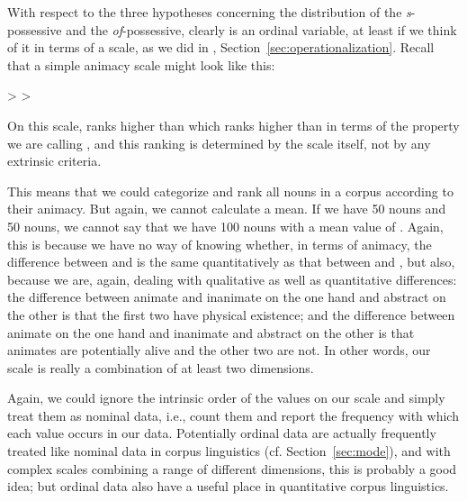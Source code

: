 With respect to the three hypotheses  concerning the distribution  of the \textit{s}\hyp{}possessive  and the \textit{of}-possessive, clearly   is an ordinal  variable, at least if we think of it in terms of a scale, as we did in , Section~\ref{sec:operationalization}. Recall that a simple animacy scale might look like this:

\begin{exe}
\ex {} >  > 
\label{ex:simpleanimacyscale}
\end{exe}

On this scale,   ranks higher than  which ranks higher than   in terms of the property we are calling , and this ranking is determined by the scale itself, not by any extrinsic criteria.

This means that we could categorize  and rank all nouns in a corpus according to their animacy. But again, we cannot calculate a mean.  If we have 50   nouns and 50  nouns, we cannot say that we have 100 nouns with a mean value of . Again, this is because we have no way of knowing whether, in terms of animacy,  the difference between  and  is the same quantitatively as that between   and , but also, because we are, again, dealing with qualitative as well as quantitative differences: the difference between animate and inanimate  on the one hand and abstract on the other is that the first two have physical existence; and the difference between animate on the one hand and inanimate  and abstract on the other is that animates are potentially alive and the other two are not. In other words, our scale is really a combination of at least two dimensions.

Again, we could ignore the intrinsic order of the values on our   scale and simply treat them as nominal  data, i.e., count them and report the frequency  with which each value occurs in our data. Potentially ordinal  data are actually frequently treated like nominal data in corpus linguistics (cf. Section~\ref{sec:mode}), and with complex scales combining a range of different dimensions, this is probably a good idea; but ordinal data also have a useful place in quantitative  corpus linguistics.

